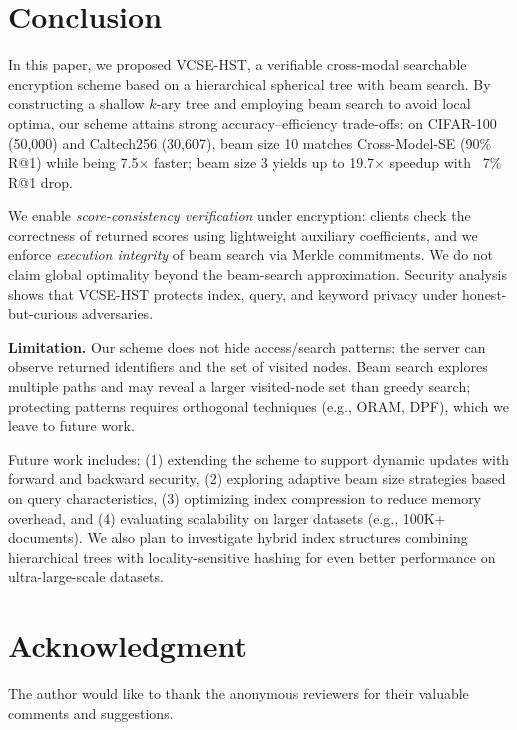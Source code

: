 \documentclass[journal]{IEEEtran}
\begin{document}
\section{Conclusion}
\label{sec:conclusion}

In this paper, we proposed VCSE-HST, a verifiable cross-modal searchable encryption scheme based on a hierarchical spherical tree with beam search. By constructing a shallow $k$-ary tree and employing beam search to avoid local optima, our scheme attains strong accuracy–efficiency trade-offs: on CIFAR-100 (50{,}000) and Caltech256 (30{,}607), beam size 10 matches Cross-Model-SE (90\% R@1) while being 7.5$\times$ faster; beam size 3 yields up to 19.7$\times$ speedup with ~7\% R@1 drop.

We enable \emph{score-consistency verification} under encryption: clients check the correctness of returned scores using lightweight auxiliary coefficients, and we enforce \emph{execution integrity} of beam search via Merkle commitments. We do not claim global optimality beyond the beam-search approximation. Security analysis shows that VCSE-HST protects index, query, and keyword privacy under honest-but-curious adversaries.

\noindent\textbf{Limitation.} Our scheme does not hide access/search patterns: the server can observe returned identifiers and the set of visited nodes. Beam search explores multiple paths and may reveal a larger visited-node set than greedy search; protecting patterns requires orthogonal techniques (e.g., ORAM, DPF), which we leave to future work.

Future work includes: (1) extending the scheme to support dynamic updates with forward and backward security, (2) exploring adaptive beam size strategies based on query characteristics, (3) optimizing index compression to reduce memory overhead, and (4) evaluating scalability on larger datasets (e.g., 100K+ documents). We also plan to investigate hybrid index structures combining hierarchical trees with locality-sensitive hashing for even better performance on ultra-large-scale datasets.

\section*{Acknowledgment}

The author would like to thank the anonymous reviewers for their valuable comments and suggestions.




\vspace{12pt}
\end{document}
